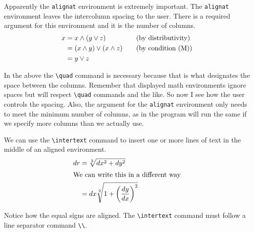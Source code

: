 \documentclass[12pt]{amsart}
\begin{document}
Apparently the \verb+alignat+ environment is extremely important. The \texttt{alignat} environment leaves the intercolumn spacing to the user. There is a required argument for this environment and it is the number of columns. 
\begin{alignat}{2}
   x &= x \wedge (y \vee z) &
   &\quad\text{(by distributivity)}\\
      &= (x \wedge y) \vee (x \wedge z ) & &
        \quad\text{(by condition (M))} \notag\\
      &= y \vee z \notag
\end{alignat}

In the above the \verb+\quad+ command is necessary because that is what designates the space between the columns. Remember that displayed math environments ignore spaces but will respect \verb+\quad+ commands and the like. So now I see how the user controls the spacing. Also, the argument for the \texttt{alignat} environment only needs to meet the minimum number of columns, as in the program will run the same if we specify more columns than we actually use. 

We can use the \verb+\intertext+ command to insert one or more lines of text in the middle of an aligned environment. 
\begin{align*}
   dr 	&= \sqrt[2]{dx^2 + dy^2} \\
   \intertext{We can write this in a different way}
   	& = dx \sqrt[2]{1 + \left(\frac{dy}{dx}\right)^2}
\end{align*}

Notice how the equal signs are aligned. The \verb+\intertext+ command must follow a line separator command \verb+\\+.
\vspace{15 pt}
\end{document}

